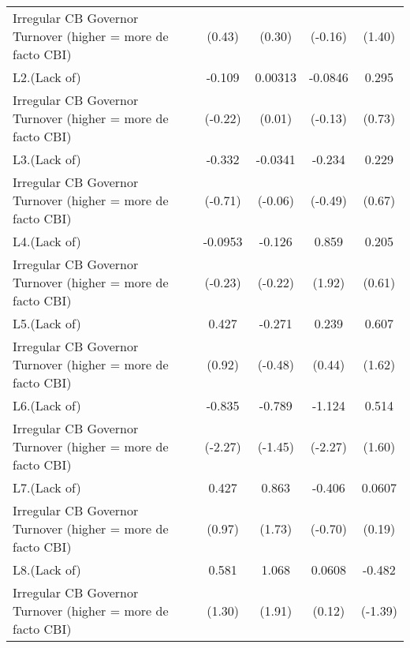 {\begin{tabular}{l*{4}{c}}
Irregular CB Governor Turnover (higher = more de facto CBI)&      (0.43)         &      (0.30)         &     (-0.16)         &      (1.40)         \\
[1em]
L2.(Lack of)        &      -0.109         &     0.00313         &     -0.0846         &       0.295         \\
Irregular CB Governor Turnover (higher = more de facto CBI)&     (-0.22)         &      (0.01)         &     (-0.13)         &      (0.73)         \\
[1em]
L3.(Lack of)        &      -0.332         &     -0.0341         &      -0.234         &       0.229         \\
Irregular CB Governor Turnover (higher = more de facto CBI)&     (-0.71)         &     (-0.06)         &     (-0.49)         &      (0.67)         \\
[1em]
L4.(Lack of)        &     -0.0953         &      -0.126         &       0.859         &       0.205         \\
Irregular CB Governor Turnover (higher = more de facto CBI)&     (-0.23)         &     (-0.22)         &      (1.92)         &      (0.61)         \\
[1em]
L5.(Lack of)        &       0.427         &      -0.271         &       0.239         &       0.607         \\
Irregular CB Governor Turnover (higher = more de facto CBI)&      (0.92)         &     (-0.48)         &      (0.44)         &      (1.62)         \\
[1em]
L6.(Lack of)        &      -0.835\sym{*}  &      -0.789         &      -1.124\sym{*}  &       0.514         \\
Irregular CB Governor Turnover (higher = more de facto CBI)&     (-2.27)         &     (-1.45)         &     (-2.27)         &      (1.60)         \\
[1em]
L7.(Lack of)        &       0.427         &       0.863         &      -0.406         &      0.0607         \\
Irregular CB Governor Turnover (higher = more de facto CBI)&      (0.97)         &      (1.73)         &     (-0.70)         &      (0.19)         \\
[1em]
L8.(Lack of)        &       0.581         &       1.068         &      0.0608         &      -0.482         \\
Irregular CB Governor Turnover (higher = more de facto CBI)&      (1.30)         &      (1.91)         &      (0.12)         &     (-1.39)         \\

\end{tabular}}
